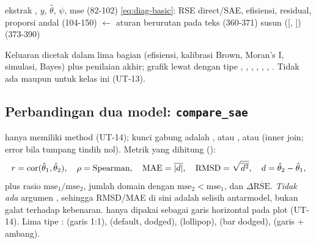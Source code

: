 \begin{algorithm}[htbp]
\caption{\texttt{diagnose} --- alur sebenarnya (\texttt{R/diagnose.R:73-410})}\label{alg:diagnose}
ekstrak , $y$, $\hat\theta$, $\psi$, $\mathrm{mse}$ (82-102)\;
\eqref{eq:diag-basic}: RSE direct/SAE, efisiensi, residual, proporsi andal (104-150)\;
\;
\;
\;
\;
 $\leftarrow$ aturan berurutan pada teks (360-371)\;
susun  ([, ]) (373-390)\;
\end{algorithm}

Keluaran dicetak  dalam lima bagian (efisiensi,
kalibrasi Brown, Moran's I, simulasi, Bayes) plus penilaian akhir; grafik
lewat  dengan tipe , ,
, , , , .
Tidak ada  maupun  untuk kelas ini (UT-13).

\subsection{Perbandingan dua model: \texttt{compare\_sae}}\label{sec:compare}

 hanya
memiliki method  (UT-14); kunci gabung adalah
, atau , atau 
(inner join; error bila tumpang tindih nol). Metrik yang dihitung
():
\begin{equation}
  r=\operatorname{cor}(\hat\theta_1,\hat\theta_2),\quad
  \rho=\text{Spearman},\quad
  \mathrm{MAE}=\overline{\left|d\right|},\quad
  \mathrm{RMSD}=\sqrt{\overline{d^{2}}},\quad
  d=\hat\theta_2-\hat\theta_1,
  \label{eq:compare-metrics}
\end{equation}
plus rasio $\mathrm{mse}_1/\mathrm{mse}_2$, jumlah domain dengan
$\mathrm{mse}_2<\mathrm{mse}_1$, dan $\Delta\overline{\mathrm{RSE}}$.
\emph{Tidak ada} argumen , sehingga RMSD/MAE di sini adalah
selisih antarmodel, bukan galat terhadap kebenaran.
 hanya dipakai sebagai garis horizontal pada plot
 (UT-14). Lima tipe :  (garis 1:1),
 (default, dodged),  (lollipop),
 (bar dodged),  (garis + ambang).

